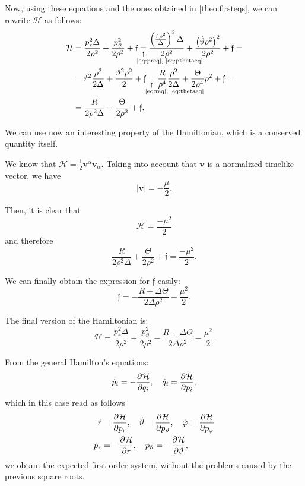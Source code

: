 Now, using these equations and the ones obtained in \autoref{theo:firsteqs}, we can rewrite $\mathcal{H}$ as follows:
\begin{align*}
	\mathcal{H} &= \frac{p_r^2 \Delta}{2\rho^2} + \frac{p_\vartheta^2}{2\rho^2} + \mathfrak{f} \eqnote{=}{\ref{eq:preq}, \ref{eq:pthetaeq}} \frac{\left( \frac{\dot{r}\rho^2}{\Delta} \right)^2 \Delta}{2\rho^2} + \frac{\left(\dot{\vartheta}\rho^2\right)^2}{2\rho^2} + \mathfrak{f} = \\
	&= \dot{r}^2\frac{\rho^2}{2\Delta} + \frac{\dot{\vartheta}^2\rho^2}{2} + \mathfrak{f} \eqnote{=}{\ref{eq:req}, \ref{eq:thetaeq}} \frac{R}{\rho^4 }\frac{\rho^2}{2\Delta} + \frac{\Theta}{2\rho^4}\rho^2 + \mathfrak{f} =\\
	&= \frac{R}{2\rho^2\Delta} + \frac{\Theta}{2\rho^2} + \mathfrak{f}.
\end{align*}

We can use now an interesting property of the Hamiltonian, which is a conserved quantity itself.

We know that $\mathcal{H} = \frac{1}{2} \mathbf{v}^\alpha \mathbf{v}_\alpha$. Taking into account that $\mathbf{v}$ is a normalized timelike vector, we have
\[
	\vert \mathbf{v} \vert = - \frac{\mu}{2}.
\]

Then, it is clear that
\[
	\mathcal{H} = \frac{-\mu^2}{2}
\]
and therefore
\[
	\frac{R}{2\rho^2\Delta} + \frac{\Theta}{2\rho^2} + \mathfrak{f} = \frac{-\mu^2}{2}.
\]

We can finally obtain the expression for $\mathfrak{f}$ easily:
\[
	\mathfrak{f} = - \frac{R + \Delta \Theta}{2\Delta\rho^2} - \frac{\mu^2}{2}.
\]

The final version of the Hamiltonian is:
\begin{equation}
	\mathcal{H} = \frac{p_r^2 \Delta}{2\rho^2} + \frac{p_\vartheta^2}{2\rho^2} - \frac{R + \Delta \Theta}{2\Delta\rho^2} - \frac{\mu^2}{2}.
\end{equation}

From the general Hamilton's equations:
\[
	\dot{p}_i = -\frac{\partial^{} \mathcal{H}}{\partial q_i}, \quad \dot{q}_i = \frac{\partial^{} \mathcal{H}}{\partial p_i},
\]
which in this case read as follows
\begin{align*}
	\dot{r} &= \frac{\partial^{} \mathcal{H}}{\partial p_r}, \quad \dot{\vartheta} = \frac{\partial^{} \mathcal{H}}{\partial p_\vartheta}, \quad \dot{\varphi} = \frac{\partial^{} \mathcal{H}}{\partial p_\varphi} \\
	\dot{p}_r &= - \frac{\partial^{} \mathcal{H}}{\partial r}, \quad \dot{p}_\vartheta = - \frac{\partial^{} \mathcal{H}}{\partial \vartheta},
\end{align*}
we obtain the expected first order system, without the problems caused by the previous square roots.

